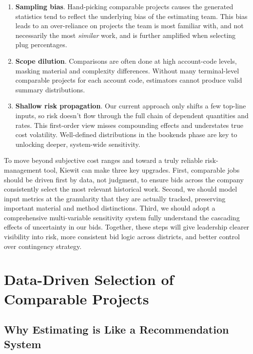 \documentclass[12pt, a4paper]{article} %
\begin{document}
\begin{enumerate}
  \item \textbf{Sampling bias}.  Hand-picking comparable projects causes the generated statistics tend to reflect the underlying bias of the estimating team. This bias leads to an over-reliance on projects the team is most familiar with, and not necessarily the most \emph{similar} work, and is further amplified when selecting plug percentages. 
  \item \textbf{Scope dilution}.  Comparisons are often done at high account-code levels, masking material and complexity differences. Without many terminal-level comparable projects for each account code, estimators cannot produce valid summary distributions.
  \item \textbf{Shallow risk propagation}. Our current approach only shifts a few top-line inputs, so risk doesn’t flow through the full chain of dependent quantities and rates. This first-order view misses compounding effects and understates true cost volatility. Well-defined distributions in the bookends phase are key to unlocking deeper, system-wide sensitivity.
\end{enumerate}

\bigskip

To move beyond subjective cost ranges and toward a truly reliable risk-management tool, Kiewit can make three key upgrades. First, comparable jobs should be driven first by data, not judgment, to ensure bids across the company consistently select the most relevant historical work. Second, we should model input metrics at the granularity that they are actually tracked, preserving important material and method distinctions. Third, we should adopt a comprehensive multi-variable sensitivity system fully understand the cascading effects of uncertainty in our bids. Together, these steps will give leadership clearer visibility into risk, more consistent bid logic across districts, and better control over contingency strategy.

\section{Data-Driven Selection of Comparable Projects}

\subsection*{Why Estimating is Like a Recommendation System}
\end{document}
